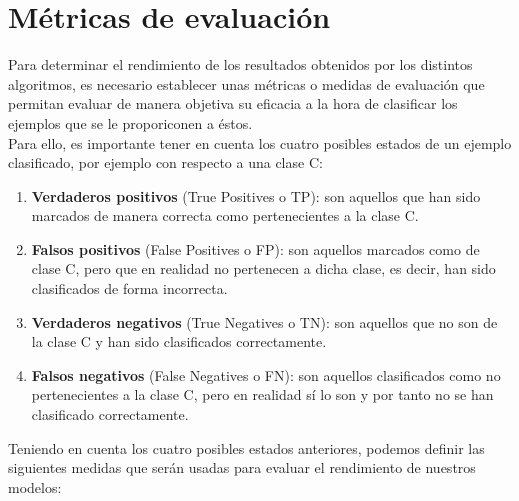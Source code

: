 \documentclass[a4paper,12pt]{report}
\begin{document}
\section{Métricas de evaluación}

Para determinar el rendimiento de los resultados obtenidos por los distintos algoritmos, es necesario establecer unas métricas o medidas de evaluación que permitan evaluar de manera objetiva su eficacia a la hora de clasificar los ejemplos que se le proporiconen a éstos.
\vspace{4mm}\\
Para ello, es importante tener en cuenta los cuatro posibles estados de un ejemplo clasificado, por ejemplo con respecto a una clase C:

\begin{enumerate}
\item \textbf{Verdaderos positivos} (True Positives o TP): son aquellos que han sido marcados de manera correcta como pertenecientes a la clase C.

\item \textbf{Falsos positivos} (False Positives o FP): son aquellos marcados como de clase C, pero que en realidad no pertenecen a dicha clase, es decir, han sido clasificados de forma incorrecta.

\item \textbf{Verdaderos negativos} (True Negatives o TN): son aquellos que no son de la clase C y han sido clasificados correctamente.

\item \textbf{Falsos negativos} (False Negatives o FN): son aquellos clasificados como no pertenecientes a la clase C, pero en realidad sí lo son y por tanto no se han clasificado correctamente.

\end{enumerate}

\vspace{6mm}
Teniendo en cuenta los cuatro posibles estados anteriores, podemos definir las siguientes medidas que serán usadas para evaluar el rendimiento de nuestros modelos:
\end{document}
